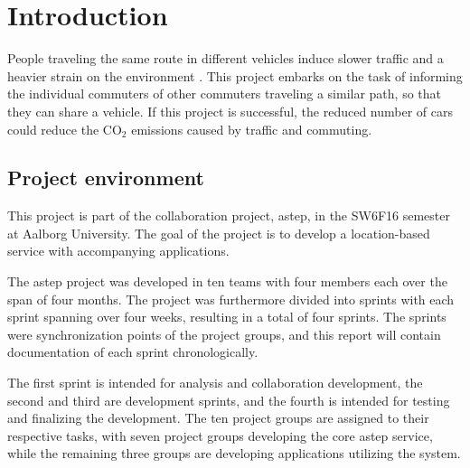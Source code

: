 \chapter{Introduction}\label{ch:introduction}


People traveling the same route in different vehicles induce slower traffic and a heavier strain on the environment \cite{trafficJam}\cite{trafficEmissions}.
This project embarks on the task of informing the individual commuters of other commuters traveling a similar path, so that they can share a vehicle.
If this project is successful, the reduced number of cars could reduce the CO$_2$ emissions caused by traffic and commuting.

\section{Project environment}
This project is part of the collaboration project, \gls{astep}, in the SW6F16 semester at Aalborg University.
The goal of the project is to develop a location-based service with accompanying applications. 

The \gls{astep} project was developed in ten teams with four members each over the span of four months.
The project was furthermore divided into sprints with each sprint spanning over four weeks, resulting in a total of four sprints.
The sprints were synchronization points of the project groups, and this report will contain documentation of each sprint chronologically.

The first sprint is intended for analysis and collaboration development, the second and third are development sprints, and the fourth is intended for testing and finalizing the development.
The ten project groups are assigned to their respective tasks, with seven project groups developing the core \gls{astep} service, while the remaining three groups are developing applications utilizing the system.



